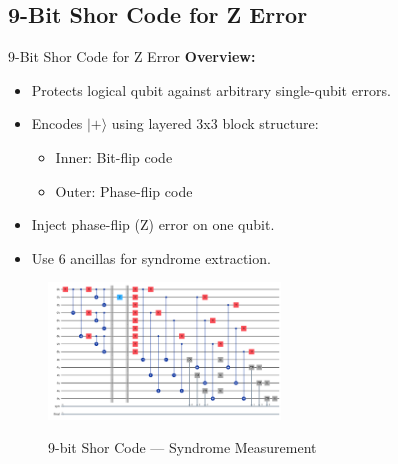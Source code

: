\documentclass[10pt]{beamer}
\begin{document}
\subsection{9-Bit Shor Code for Z Error}
\begin{frame}{9-Bit Shor Code for Z Error}
\textbf{Overview:}
\begin{itemize}
    \item Protects logical qubit against arbitrary single-qubit errors.
    \item Encodes $|+\rangle$ using layered 3x3 block structure:
    \begin{itemize}
        \item Inner: Bit-flip code
        \item Outer: Phase-flip code
    \end{itemize}
    \item Inject phase-flip (Z) error on one qubit.
    \item Use 6 ancillas for syndrome extraction.
\end{itemize}

\begin{figure}[h!]
\centering
\includegraphics[width=0.55\textwidth]{../../Codes/results/9bitCode/SyndromeMeasurementCircuit.png} \\[4pt]
\caption{9-bit Shor Code — Syndrome Measurement}
\end{figure}
\end{frame}
\end{document}
